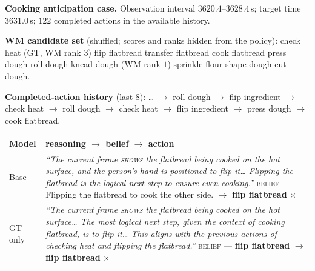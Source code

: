 \documentclass[letterpaper]{article}
\newcommand{\obs}[1]{\textcolor{measuredblue}{#1}}
\begin{document}
\begin{table}[t]
\footnotesize
\setlength{\parindent}{0pt}
\textbf{Cooking anticipation case.} Observation interval
\obs{$3620.4$--$3628.4$}\,s; target time \obs{$3631.0$}\,s; \obs{$122$}
completed actions in the available history.\par
\smallskip
\textbf{WM candidate set} (shuffled; scores and ranks hidden from the policy):
check heat (GT, WM rank \obs{$3$}) \textperiodcentered{} flip flatbread
\textperiodcentered{} transfer flatbread \textperiodcentered{} cook flatbread
\textperiodcentered{} press dough \textperiodcentered{} roll dough
\textperiodcentered{} knead dough (WM rank \obs{$1$}) \textperiodcentered{}
sprinkle flour \textperiodcentered{} shape dough \textperiodcentered{} cut
dough.\par
\smallskip
\textbf{Completed-action history} (last \obs{$8$}): \ldots{} $\rightarrow$ roll
dough $\rightarrow$ flip ingredient $\rightarrow$ check heat $\rightarrow$ roll
dough $\rightarrow$ check heat $\rightarrow$ flip ingredient $\rightarrow$ press
dough $\rightarrow$ cook flatbread.\par
\medskip
\setlength{\tabcolsep}{6pt}
\begin{tabular}{@{}p{}p{}@{}}
\toprule
Model & reasoning $\rightarrow$ belief $\rightarrow$ action \\
\midrule
Base
  & \emph{``The current frame \textsc{shows} the flatbread being cooked on the
    hot surface, and the person's hand is positioned to flip it\ldots{}
    Flipping the flatbread is the logical next step to ensure even cooking.''}
    \newline
    \textsc{belief} --- Flipping the flatbread to cook the other side.
    \newline
    $\rightarrow$ \textbf{flip flatbread} $\times$
    \quad{\scriptsize[scene description via ``shows'']} \\
GT-only
  & \emph{``The current frame \textsc{shows} the flatbread being cooked on the
    hot surface\ldots{} The most logical next step, given the context of
    cooking flatbread, is to flip it\ldots{} This aligns with
    \underline{the previous actions} of checking heat and flipping the
    flatbread.''}
    \newline
    \textsc{belief} --- \textbf{flip flatbread}
    \quad{\scriptsize[action-copying belief]}
    \newline
    $\rightarrow$ \textbf{flip flatbread} $\times$
    \quad{\scriptsize[scene description via ``shows'']} \\

\end{tabular}
\end{table}
\end{document}
